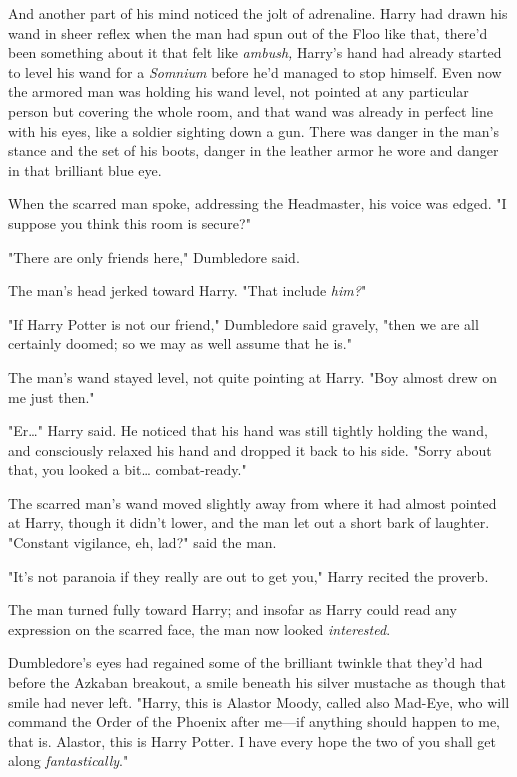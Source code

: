 And another part of his mind noticed the jolt of adrenaline. Harry had drawn his wand in sheer reflex when the man had spun out of the Floo like that, there'd been something about it that felt like \emph{ambush,} Harry's hand had already started to level his wand for a \emph{Somnium} before he'd managed to stop himself. Even now the armored man was holding his wand level, not pointed at any particular person but covering the whole room, and that wand was already in perfect line with his eyes, like a soldier sighting down a gun. There was danger in the man's stance and the set of his boots, danger in the leather armor he wore and danger in that brilliant blue eye.

When the scarred man spoke, addressing the Headmaster, his voice was edged. "I suppose you think this room is secure?"

"There are only friends here," Dumbledore said.

The man's head jerked toward Harry. "That include \emph{him?}"

"If Harry Potter is not our friend," Dumbledore said gravely, "then we are all certainly doomed; so we may as well assume that he is."

The man's wand stayed level, not quite pointing at Harry. "Boy almost drew on me just then."

"Er{\ldots}" Harry said. He noticed that his hand was still tightly holding the wand, and consciously relaxed his hand and dropped it back to his side. "Sorry about that, you looked a bit{\ldots} combat-ready."

The scarred man's wand moved slightly away from where it had almost pointed at Harry, though it didn't lower, and the man let out a short bark of laughter. "Constant vigilance, eh, lad?" said the man.

"It's not paranoia if they really are out to get you," Harry recited the proverb.

The man turned fully toward Harry; and insofar as Harry could read any expression on the scarred face, the man now looked \emph{interested}.

Dumbledore's eyes had regained some of the brilliant twinkle that they'd had before the Azkaban breakout, a smile beneath his silver mustache as though that smile had never left. "Harry, this is Alastor Moody, called also Mad-Eye, who will command the Order of the Phoenix after me---if anything should happen to me, that is. Alastor, this is Harry Potter. I have every hope the two of you shall get along \emph{fantastically}."

